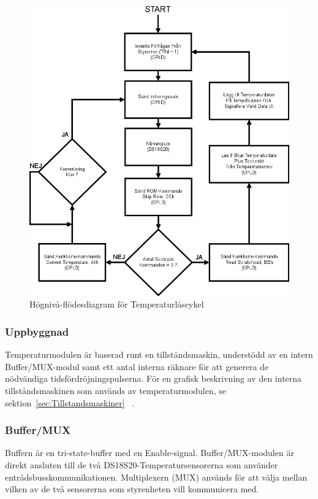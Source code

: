 \documentclass[a4paper,11pt]{article}
\begin{document}
		\begin{figure}[H]
		  \centering
		      \includegraphics[scale=0.5, angle=0]{ReadCycleFlowChart.png}
		  	\caption{Högnivå-flödesdiagram för Temperaturläscykel}
			\label{fig:RCFlowChart}
		\end{figure}

	\subsubsection{Uppbyggnad}

	Temperaturmodulen är baserad runt en tillståndsmaskin, understödd av en intern Buffer/MUX-modul samt 
	ett antal interna räknare för att generera de nödvändiga tidsfördröjningspulserna. För en grafisk beskrivning av den interna tillståndsmaskinen som används av temperaturmodulen,
	se sektion~\ref{sec:Tillstandsmaskiner} ~.

	\subsubsection{Buffer/MUX}

	Buffern är en tri-state-buffer med en Enable-signal.
	Buffer/MUX-modulen är direkt ansluten till de två DS18S20-Temperatursensorerna som använder entrådsbusskommunikationen.
	Multiplexern (MUX) används för att välja mellan vilken av de två sensorerna som styrenheten vill kommunicera med.
\end{document}
